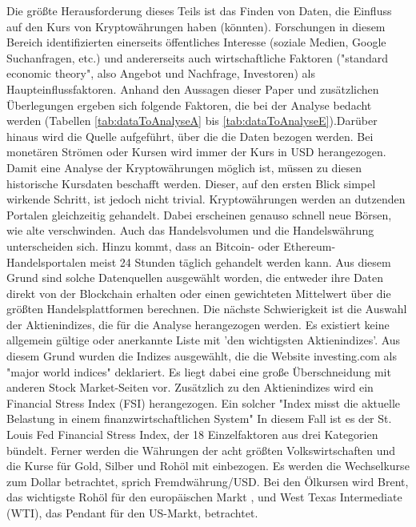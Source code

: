 Die größte Herausforderung dieses Teils ist das Finden von Daten, die Einfluss auf den Kurs von Kryptowährungen haben (könnten). Forschungen in diesem Bereich identifizierten einerseits öffentliches Interesse (soziale Medien, Google Suchanfragen, etc.) und andererseits auch wirtschaftliche Faktoren ("standard economic theory", also Angebot und Nachfrage, Investoren)\citep{kristoufek_what_2015} als Haupteinflussfaktoren. Anhand den Aussagen dieser Paper und zusätzlichen Überlegungen ergeben sich folgende Faktoren, die bei der Analyse bedacht werden (Tabellen \ref{tab:dataToAnalyseA} bis \ref{tab:dataToAnalyseE}).\newline Darüber hinaus wird die Quelle aufgeführt, über die die Daten bezogen werden. Bei monetären Strömen oder Kursen wird immer der Kurs in USD herangezogen. 
\newline
Damit eine Analyse der Kryptowährungen möglich ist, müssen zu diesen historische Kursdaten beschafft werden. Dieser, auf den ersten Blick simpel wirkende Schritt, ist jedoch nicht trivial. Kryptowährungen werden an dutzenden Portalen gleichzeitig gehandelt. Dabei erscheinen genauso schnell neue Börsen, wie alte verschwinden. Auch das Handelsvolumen und die Handelswährung unterscheiden sich. Hinzu kommt, dass an Bitcoin- oder Ethereum-Handelsportalen meist 24 Stunden täglich gehandelt werden kann. Aus diesem Grund sind solche Datenquellen ausgewählt worden, die entweder ihre Daten direkt von der Blockchain erhalten oder einen gewichteten Mittelwert über die größten Handelsplattformen berechnen.
\newline
Die nächste Schwierigkeit ist die Auswahl der Aktienindizes, die für die Analyse herangezogen werden. Es existiert keine allgemein gültige oder anerkannte Liste mit 'den wichtigsten Aktienindizes'. Aus diesem Grund wurden die Indizes ausgewählt, die die Website investing.com als "major world indices" deklariert.\citep{fusionmedialimited_major_2017} Es liegt dabei eine große Überschneidung mit anderen Stock Market-Seiten vor. Zusätzlich zu den Aktienindizes wird ein Financial Stress Index (FSI) herangezogen. Ein solcher "Index misst die aktuelle Belastung in einem finanzwirtschaftlichen System"\citep[S.~1; eigene Übersetzung]{vermeulen_financial_2014} In diesem Fall ist es der St. Louis Fed Financial Stress Index, der 18 Einzelfaktoren aus drei Kategorien bündelt.\citep{federal_reserve_bank_of-st._louis_st._2017}
\newline
Ferner werden die Währungen der acht größten Volkswirtschaften\citep{the_international_monetary_fund_world_2017} und die Kurse für Gold, Silber und Rohöl mit einbezogen. Es werden die Wechselkurse zum Dollar betrachtet, sprich Fremdwährung/USD. Bei den Ölkursen wird Brent, das wichtigste Rohöl für den europäischen Markt \citep{wikimedia_brent_2016}, und West Texas Intermediate (WTI), das Pendant für den US-Markt, betrachtet\citep{wikimedia_west_2017}.

